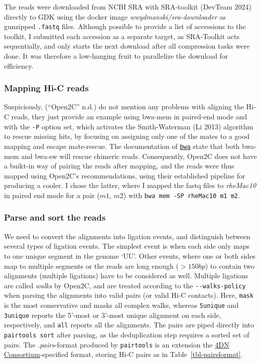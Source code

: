 \documentclass[
  11pt,
  a4paper,
]{scrbook}
\begin{document}
The reads were downloaded from NCBI SRA with SRA-toolkit (DevTeam 2024)
directly to GDK using the docker image \emph{wwydmanski/sra-downloader}
as gunzipped \texttt{.fastq} files. Although possible to provide a list
of accessions to the toolkit, I submitted each accession as a separate
target, as SRA-Toolkit acts sequentially, and only starts the next
download after all compression tasks were done. It was therefore a
low-hanging fruit to parallelize the download for efficiency.

\subsubsection{Mapping Hi-C reads}\label{mapping-hi-c-reads}

Suspiciously, ({``{Open2C}''} n.d.) do not mention any problems with
aligning the Hi-C reads, they just provide an example using bwa-mem in
paired-end mode and with the \texttt{-P} option set, which activates the
Smith-Waterman (Li 2013) algorithm to rescue missing hits, by focusing
on assigning only one of the mates to a good mapping and escape
mate-rescue. The documentation of
\href{https://bio-bwa.sourceforge.net}{\texttt{bwa}} state that both
bwa-mem and bwa-sw will rescue chimeric reads. Consequently, Open2C does
not have a buikt-in way of pairing the reads after mapping, and the
reads were thus mapped using Open2C's recommendations, using their
established pipeline for producing a cooler. I chose the latter, where I
mapped the fastq files to \emph{rheMac10} in paired end mode for a pair
(\(m1\), \(m2\)) with \texttt{bwa\ mem\ -SP\ rheMac10\ m1\ m2}.

\subsubsection{Parse and sort the reads}\label{parse-and-sort-the-reads}

We need to convert the alignments into ligation events, and distinguish
between several types of ligation events. The simplest event is when
each side only maps to one unique segment in the genome `UU'. Other
events, where one or both sides map to multiple segments or the reads
are long enough (\(>150bp\)) to contain two alignments (multiple
ligations) have to be considered as well. Multiple ligations are called
\emph{walks} by Open2C, and are treated according to the
\texttt{-\/-walks-policy} when parsing the alignments into valid pairs
(or valid Hi-C contacts). Here, \texttt{mask} is the most conservative
and masks all complex walks, whereas \texttt{5unique} and
\texttt{3unique} reports the 5'-most or 3'-most unique alignment on each
side, respectively, and \texttt{all} reports all the alignments. The
pairs are piped directly into \texttt{pairtools\ sort} after parsing, as
the deduplication step requires a sorted set of pairs. The
\emph{.pairs}-format produced by \texttt{pairtools} is an extension the
\href{https://data.4dnucleome.org/file-formats/pairs/}{4DN
Consortium}-specified format, storing Hi-C pairs as in
Table~\ref{tbl-pairsformat}.
\end{document}
